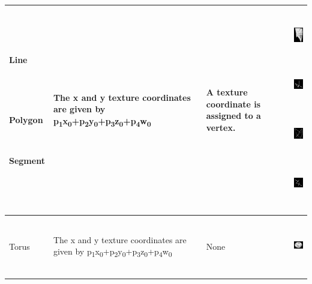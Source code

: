 \begin{center}
\begin{supertabular}{|m{0.712in}|m{3.36in}|m{0.9in}|m{0.7in}|}
~

Line

~

~

Polygon

~

Segment

~
 &
The x and y texture coordinates are given by
p\textsubscript{1}x\textsubscript{0}+p\textsubscript{2}y\textsubscript{0}+p\textsubscript{3}z\textsubscript{0}+p\textsubscript{4}w\textsubscript{0}
 &
A texture coordinate is assigned to a vertex.  &


\begin{center}
\includegraphics[width=0.6602in,height=0.6602in]{ub-img/ub-img27.jpg}
\end{center}
\begin{center}
\includegraphics[width=0.6602in,height=0.6602in]{ub-img/ub-img28.jpg}
\end{center}
\begin{center}
\includegraphics[width=0.6602in,height=0.6602in]{ub-img/ub-img29.jpg}
\end{center}
\begin{center}
\includegraphics[width=0.6602in,height=0.6602in]{ub-img/ub-img30.jpg}
\end{center}
\\\hline
Torus &
The x and y texture coordinates are given by
p\textsubscript{1}x\textsubscript{0}+p\textsubscript{2}y\textsubscript{0}+p\textsubscript{3}z\textsubscript{0}+p\textsubscript{4}w\textsubscript{0}
&
None &
\begin{center}
\includegraphics[width=0.6693in,height=0.698in]{ub-img/ub-img31.jpg}
\end{center}
\\\hline
\end{supertabular}
\end{center}

